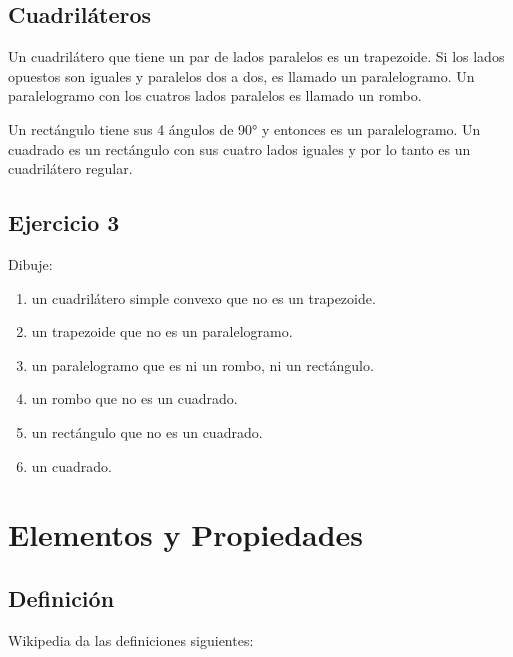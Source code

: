 \subsection{Cuadriláteros}

Un cuadrilátero que tiene un par de lados paralelos es un trapezoide. Si
los lados opuestos son iguales y paralelos dos a dos, es llamado un
paralelogramo. Un paralelogramo con los cuatros lados paralelos es llamado
un rombo.

Un rectángulo tiene sus 4 ángulos de 90° y entonces es un
paralelogramo. Un cuadrado es un rectángulo con sus cuatro lados iguales y
por lo tanto es un cuadrilátero regular. 

\subsection{Ejercicio 3}

Dibuje:

\begin{enumerate}
\item un cuadrilátero simple convexo que no es un trapezoide.
\item un trapezoide que no es un paralelogramo.
\item un paralelogramo que es ni un rombo, ni un rectángulo.
\item un rombo que no es un cuadrado.
\item un rectángulo que no es un cuadrado.
\item un cuadrado.
\end{enumerate}

\section{Elementos y Propiedades}

\subsection{Definición}

Wikipedia da las definiciones siguientes:

